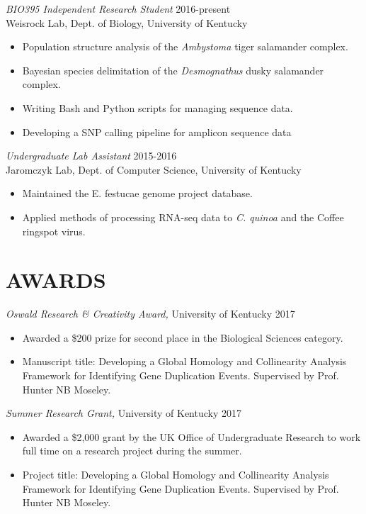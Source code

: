 \documentclass[margin, 10pt]{res} %
\begin{document}
\begin{resume}
{\sl BIO395 Independent Research Student} \hfill 2016-present \\
Weisrock Lab, Dept. of Biology, University of Kentucky
\begin{itemize} \itemsep -2pt %
\item Population structure analysis of the {\sl Ambystoma} tiger salamander complex.
\item Bayesian species delimitation of the {\sl Desmognathus} dusky salamander complex.
\item Writing Bash and Python scripts for managing sequence data.
\item Developing a SNP calling pipeline for amplicon sequence data
\end{itemize}

{\sl Undergraduate Lab Assistant} \hfill 2015-2016 \\
Jaromczyk Lab, Dept. of Computer Science, University of Kentucky
\begin{itemize} \itemsep -2pt %
\item Maintained the E. festucae genome project database.
\item Applied methods of processing RNA-seq data to {\sl C. quinoa} and the Coffee ringspot virus.
\end{itemize}


\section{AWARDS}

{\sl Oswald Research \& Creativity Award,} University of Kentucky \hfill 2017
\begin{itemize} \itemsep -2pt %
\item Awarded a \$200 prize for second place in the Biological Sciences category.
\item Manuscript title: Developing a Global Homology and Collinearity Analysis Framework for Identifying Gene Duplication Events. Supervised by Prof. Hunter NB Moseley.
\end{itemize}

{\sl Summer Research Grant,}  University of Kentucky \hfill 2017
\begin{itemize} \itemsep -2pt %
\item Awarded a \$2,000 grant by the UK Office of Undergraduate Research to work full time on a research project during the summer.
\item Project title: Developing a Global Homology and Collinearity Analysis Framework for Identifying Gene Duplication Events. Supervised by Prof. Hunter NB Moseley.
\end{itemize}


\end{resume}
\end{document}

